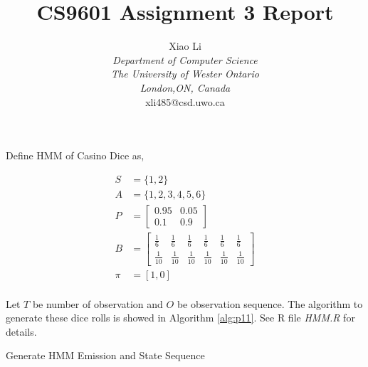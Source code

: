 \documentclass{article}
\title{CS9601 Assignment 3 Report}
\author{
Xiao Li\\
\textit{Department of Computer Science}\\
\textit{The University of Wester Ontario}\\
\textit{London,ON, Canada}\\
xli485@csd.uwo.ca
}
\date{}
\begin{document}
\maketitle

\section{}
\subsection{}
Define HMM of Casino Dice as,

\begin{equation}
\begin{aligned}
S & =  \{1,2\}\\
A & =  \{1,2,3,4,5,6\}\\
P & =  \left[ \begin{array}{ccc}
0.95 & 0.05 \\
0.1 & 0.9 \end{array}\right]\\
B & =  \left[ \begin{array}{cccccc}
\frac{1}{6} & \frac{1}{6} & \frac{1}{6}& \frac{1}{6}& \frac{1}{6}& \frac{1}{6}\\
\frac{1}{10} & \frac{1}{10} & \frac{1}{10}& \frac{1}{10}& \frac{1}{10}& \frac{1}{10}\end{array}\right]\\
\pi & =  [1,0]\\
\end{aligned}
\end{equation}

Let $T$ be number of observation and $O$ be observation sequence. The algorithm to generate these dice rolls is showed in Algorithm \ref{alg:p11}. See R file \textit{HMM.R} for details.

\begin{algorithm}
\SetAlgoLined
{}
\caption{Generate HMM Emission and State Sequence}
\label{alg:p11}
\end{algorithm}
\end{document}
